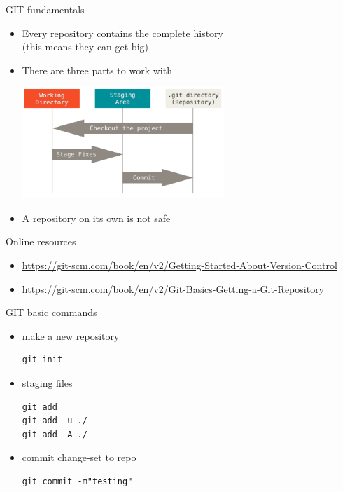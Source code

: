 \begin{frame}{GIT fundamentals}
  
  \begin{itemize}
  \item Every repository contains the complete history\\(this means
    they can get big)
  \item There are three parts to work with
    \begin{adjustbox}{center}
      \includegraphics[width=0.6\textwidth]{img/areas}
    \end{adjustbox}
  \item A repository on its own is not safe
  \end{itemize}


\end{frame}


\begin{frame}{Online resources}
  
  \begin{itemize}
  \item \url{https://git-scm.com/book/en/v2/Getting-Started-About-Version-Control}


  \item \url{https://git-scm.com/book/en/v2/Git-Basics-Getting-a-Git-Repository}
  \end{itemize}


  

\end{frame}


\begin{frame}[fragile]{GIT basic commands}

  \begin{itemize}
  \item make a new repository
\begin{verbatim}
git init
\end{verbatim}
  \item staging files
\begin{verbatim}
git add
git add -u ./
git add -A ./
\end{verbatim}
  \item commit change-set to repo
\begin{verbatim}
git commit -m"testing"
\end{verbatim}
  \end{itemize}
\end{frame}


